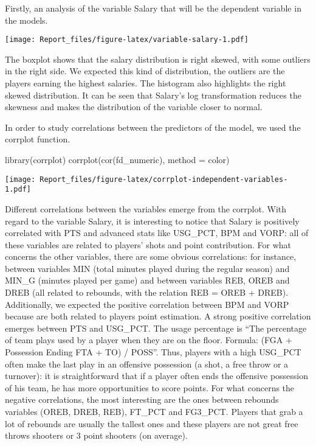 \documentclass[
]{article}
\newenvironment{Shaded}{\begin{snugshade}}{\end{snugshade}}
\newcommand{\AttributeTok}[1]{\textcolor[rgb]{0.77,0.63,0.00}{#1}}
\newcommand{\FunctionTok}[1]{\textcolor[rgb]{0.00,0.00,0.00}{#1}}
\newcommand{\NormalTok}[1]{#1}
\newcommand{\StringTok}[1]{\textcolor[rgb]{0.31,0.60,0.02}{#1}}
\begin{document}
Firstly, an analysis of the variable Salary that will be the dependent
variable in the models.

\texttt{[image: Report\_files/figure-latex/variable-salary-1.pdf]}

The boxplot shows that the salary distribution is right skewed, with
some outliers in the right side. We expected this kind of distribution,
the outliers are the players earning the highest salaries. The histogram
also highlights the right skewed distribution. It can be seen that
Salary's log transformation reduces the skewness and makes the
distribution of the variable closer to normal.

In order to study correlations between the predictors of the model, we
used the corrplot function.

\begin{Shaded}
\begin{Highlighting}[]
\FunctionTok{library}\NormalTok{(corrplot)}
\FunctionTok{corrplot}\NormalTok{(}\FunctionTok{cor}\NormalTok{(fd\_numeric), }\AttributeTok{method =} \StringTok{\textquotesingle{}color\textquotesingle{}}\NormalTok{)}
\end{Highlighting}
\end{Shaded}

\texttt{[image: Report\_files/figure-latex/corrplot-independent-variables-1.pdf]}

Different correlations between the variables emerge from the corrplot.
With regard to the variable Salary, it is interesting to notice that
Salary is positively correlated with PTS and advanced stats like
USG\_PCT, BPM and VORP: all of these variables are related to players'
shots and point contribution. For what concerns the other variables,
there are some obvious correlations: for instance, between variables MIN
(total minutes played during the regular season) and MIN\_G (minutes
played per game) and between variables REB, OREB and DREB (all related
to rebounds, with the relation REB = OREB + DREB). Additionally, we
expected the positive correlation between BPM and VORP because are both
related to players point estimation. A strong positive correlation
emerges between PTS and USG\_PCT. The usage percentage is ``The
percentage of team plays used by a player when they are on the floor.
Formula: (FGA + Possession Ending FTA + TO) / POSS''. Thus, players with
a high USG\_PCT often make the last play in an offensive possession (a
shot, a free throw or a turnover): it is straightforward that if a
player often ends the offensive possession of his team, he has more
opportunities to score points. For what concerns the negative
correlations, the most interesting are the ones between rebounds
variables (OREB, DREB, REB), FT\_PCT and FG3\_PCT. Players that grab a
lot of rebounds are usually the tallest ones and these players are not
great free throws shooters or 3 point shooters (on average).
\end{document}
